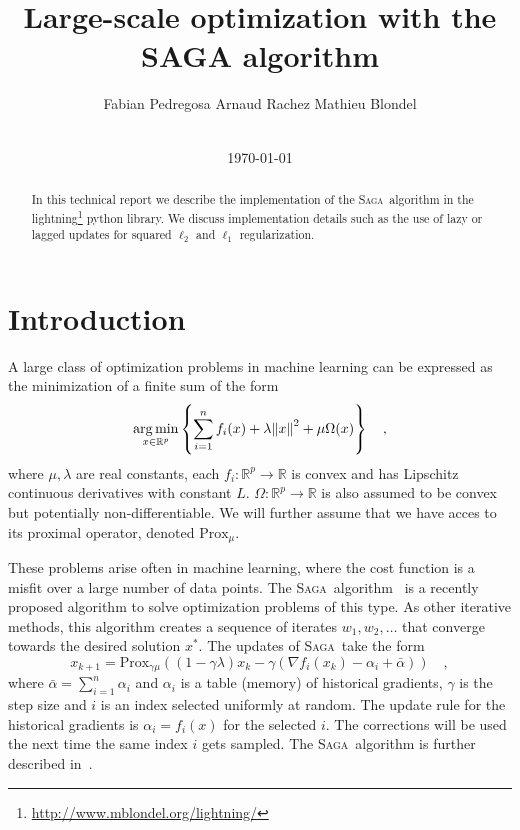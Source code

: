 \documentclass{scrartcl}
\title{Large-scale optimization with the \textsc{SAGA} algorithm}
\author{Fabian Pedregosa \qquad Arnaud Rachez \qquad Mathieu Blondel \\\\
}
\date{\today} %
\DeclareMathOperator*{\argmin}{arg\,min}
\def\RR{{\mathbb R}}
\newcommand{\SAGA}{\textsc{Saga}}
\begin{document}
\maketitle


\begin{abstract}
In this technical report we describe the implementation of the \SAGA\ algorithm in the lightning\footnote{\url{http://www.mblondel.org/lightning/}} python library. We discuss implementation details such as the use of lazy or lagged updates for squared $\ell_2$ and $\ell_1$ regularization.
\end{abstract}

\section{Introduction}

A large class of optimization problems in machine learning can be expressed as the minimization of a finite sum of the form
$$
\argmin_{x \in \RR^p} \left\{ \sum_{i=1}^n f_i(x) + \lambda \norm{x}^2 + \mu \Omega(x)\right\} \quad,
$$
where $\mu, \lambda$ are real constants, each $f_i: \RR^p \to \RR$ is convex and has Lipschitz continuous derivatives with constant $L$. $\Omega: \RR^p \to \RR$ is also assumed to be convex but potentially non-differentiable. We will further assume that we have acces to its proximal operator, denoted $\text{Prox}_{\mu}$.

These problems arise often in machine learning, where the cost function is a misfit over a large number of data points. The \SAGA\ algorithm~\citep{defazio2014saga} is a recently proposed algorithm to solve optimization problems of this type. As other iterative methods, this algorithm creates a sequence of iterates $w_1, w_2, \ldots$ that converge towards the desired solution $x^*$. The updates of \SAGA\ take the form
\begin{equation} \label{eq:update_rule}
x_{k+1} = \text{Prox}_{\gamma \mu}((1 - \gamma \lambda)x_k - \gamma (\nabla f_i(x_k) - {\alpha}_i + \bar{\alpha})) \quad,
\end{equation}
where $\bar{\alpha} = \sum_{i=1}^n \alpha_i$ and $\alpha_i$ is a table (memory) of historical gradients, $\gamma$ is the step size and $i$ is an index selected uniformly at random. The update rule for the historical gradients is $\alpha_i = f_i(x)$ for the selected $i$. The corrections will be used the next time the same index $i$ gets sampled. The \SAGA\ algorithm is further described in~\citep{defazio2014saga,hofmann2015variance}.
\end{document}

